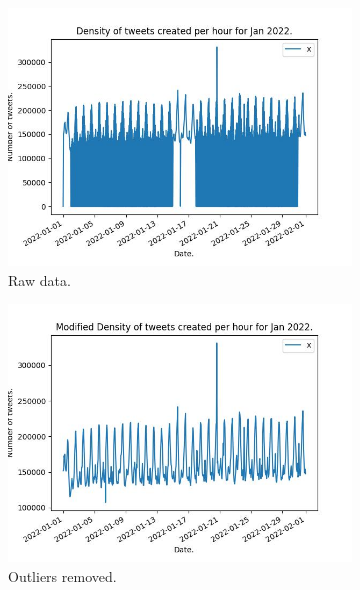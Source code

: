 \documentclass[9pt]{article}
\begin{document}
\begin{figure}[h!]
    \center
    \begin{subfigure}[b]{0.3\textwidth}
        \includegraphics[width=\textwidth]{figures/JanAllraw.jpeg}
        \caption{Raw data.}
        \label{fig:1a}
    \end{subfigure}
    \begin{subfigure}[b]{0.3\textwidth}
        \includegraphics[scale=0.3]{figures/JanAllmod.jpeg}
        \caption{Outliers removed.}
        \label{fig:1b}
    \end{subfigure}
    \begin{subfigure}[b]{0.3\textwidth}

\end{subfigure}
\end{figure}
\end{document}
